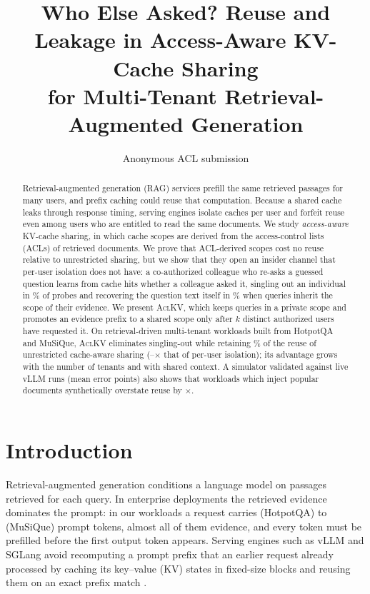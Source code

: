 \documentclass[11pt]{article}
\title{Who Else Asked? Reuse and Leakage in Access-Aware KV-Cache Sharing\\for Multi-Tenant Retrieval-Augmented Generation}
\author{Anonymous ACL submission}
\newcommand{\sysname}{\textsc{AclKV}\xspace}
\begin{document}
\maketitle

\begin{abstract}
Retrieval-augmented generation (RAG) services prefill the same retrieved passages for many users, and prefix caching could reuse that computation. Because a shared cache leaks through response timing, serving engines isolate caches per user and forfeit reuse even among users who are entitled to read the same documents. We study \emph{access-aware} KV-cache sharing, in which cache scopes are derived from the access-control lists (ACLs) of retrieved documents. We prove that ACL-derived scopes cost no reuse relative to unrestricted sharing, but we show that they open an insider channel that per-user isolation does not have: a co-authorized colleague who re-asks a guessed question learns from cache hits whether a colleague asked it, singling out an individual in \numsingledACLScope\% of probes and recovering the question text itself in \numqueryRevealedVone\% when queries inherit the scope of their evidence. We present \sysname, which keeps queries in a private scope and promotes an evidence prefix to a shared scope only after $k$ distinct authorized users have requested it. On retrieval-driven multi-tenant workloads built from HotpotQA and MuSiQue, \sysname eliminates singling-out while retaining \numaclkvRetainHQ\% of the reuse of unrestricted cache-aware sharing (\numaclkvVsPerUserHQ--\numaclkvVsPerUserMQ$\times$ that of per-user isolation); its advantage grows with the number of tenants and with shared context. A simulator validated against \numfidN{} live vLLM runs (mean error \numfidMAE{} points) also shows that workloads which inject popular documents synthetically overstate reuse by \numoverstate$\times$.
\end{abstract}

\section{Introduction}
\label{sec:intro}

Retrieval-augmented generation \citep{lewis2020rag} conditions a language model on passages retrieved for each query. In enterprise deployments the retrieved evidence dominates the prompt: in our workloads a request carries \nummeanPromptHQ{} (HotpotQA) to \nummeanPromptMQ{} (MuSiQue) prompt tokens, almost all of them evidence, and every token must be prefilled before the first output token appears. Serving engines such as vLLM \citep{kwon2023vllm} and SGLang \citep{zheng2024sglang} avoid recomputing a prompt prefix that an earlier request already processed by caching its key--value (KV) states in fixed-size blocks and reusing them on an exact prefix match \citep{vllm2026apc}.
\end{document}
